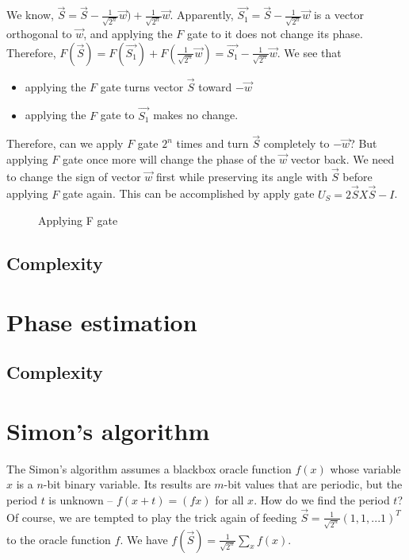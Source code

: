 \documentclass{book}
\begin{document}
We know, $\vec{S} = \vec{S} - \frac 1 {\sqrt{2^n}} \vec{w}) + \frac 1  {\sqrt{2^n}} \vec{w}$. Apparently, $\vec{S_1}  = \vec{S} - \frac 1 {\sqrt{2^n}} \vec{w}$ is a vector orthogonal to $\vec{w}$, and applying the $F$ gate to it does not change its phase. Therefore, $F(\vec{S}) = F(\vec{S_1}) + F(\frac 1  {\sqrt{2^n}} \vec{w})  = \vec{S_1} - \frac 1 {\sqrt{2^n}} \vec{w}$. We see that 
\begin{itemize}
    \item applying the $F$ gate turns vector $\vec{S}$ toward $-\vec{w}$
    \item applying the $F$ gate to $\vec{S_1}$ makes no change.
\end{itemize}
Therefore, can we apply $F$ gate $2^n$ times and turn $\vec{S}$ completely to $-\vec{w}$? But applying $F$ gate once more will change the phase of the $\vec{w}$ vector back. We need to change the sign of vector $\vec{w}$ first while preserving its angle with $\vec{S}$ before applying $F$ gate again. This can be accomplished by apply gate $U_S = 2 \vec{S}X\vec{S} -I$.

\begin{figure}[ht]
\caption{Applying F gate}
\label{grover}
\end{figure}

\subsection{Complexity}

\section{Phase estimation}
\subsection{Complexity}

\section{Simon's algorithm}
The Simon's algorithm assumes a blackbox oracle function $f(x)$ whose variable $x$ is a $n$-bit binary variable. Its results are $m$-bit values that are periodic, but the period $t$ is unknown -- $f(x+t)=(fx)$ for all $x$. How do we find the period $t$? Of course, we are tempted to play the trick again of feeding $\vec{S} = \frac 1 {\sqrt{2^n}} (1, 1, ...1)^T$ to the oracle function $f$. We have
$f(\vec{S}) = \frac 1  {\sqrt{2^n}} \sum_x f(x)$.
\end{document}
